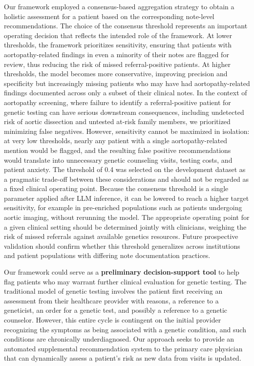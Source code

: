 \documentclass[fleqn,10pt]{wlscirep}
\begin{document}
Our framework employed a consensus-based aggregation strategy to obtain a holistic assessment for a patient based on the corresponding note-level recommendations. The choice of the consensus threshold represents an important operating decision that reflects the intended role of the framework. At lower thresholds, the framework prioritizes sensitivity, ensuring that patients with aortopathy-related findings in even a minority of their notes are flagged for review, thus reducing the risk of missed referral-positive patients. At higher thresholds, the model becomes more conservative, improving precision and specificity but increasingly missing patients who may have had aortopathy-related findings documented across only a subset of their clinical notes. In the context of aortopathy screening, where failure to identify a referral-positive patient for genetic testing can have serious downstream consequences, including undetected risk of aortic dissection and untested at-risk family members, we prioritized minimizing false negatives. However, sensitivity cannot be maximized in isolation: at very low thresholds, nearly any patient with a single aortopathy-related mention would be flagged, and the resulting false positive recommendations would translate into unnecessary genetic counseling visits, testing costs, and patient anxiety. The threshold of 0.4 was selected on the development dataset as a pragmatic trade-off between these considerations and should not be regarded as a fixed clinical operating point. Because the consensus threshold is a single parameter applied after LLM inference, it can be lowered to reach a higher target sensitivity, for example in pre-enriched populations such as patients undergoing aortic imaging, without rerunning the model. The appropriate operating point for a given clinical setting should be determined jointly with clinicians, weighing the risk of missed referrals against available genetics resources. Future prospective validation should confirm whether this threshold generalizes across institutions and patient populations with differing note documentation practices.

Our framework could serve as a \textbf{preliminary decision-support tool} to help flag patients who may warrant further clinical evaluation for genetic testing. The traditional model of genetic testing involves the patient first receiving an assessment from their healthcare provider with reasons, a reference to a geneticist, an order for a genetic test, and possibly a reference to a genetic counselor. However, this entire cycle is contingent on the initial provider recognizing the symptoms as being associated with a genetic condition, and such conditions are chronically underdiagnosed.\cite{pederson2024commentary} Our approach seeks to provide an automated supplemental recommendation system to the primary care physician that can dynamically assess a patient’s risk as new data from visits is updated. 
\end{document}
